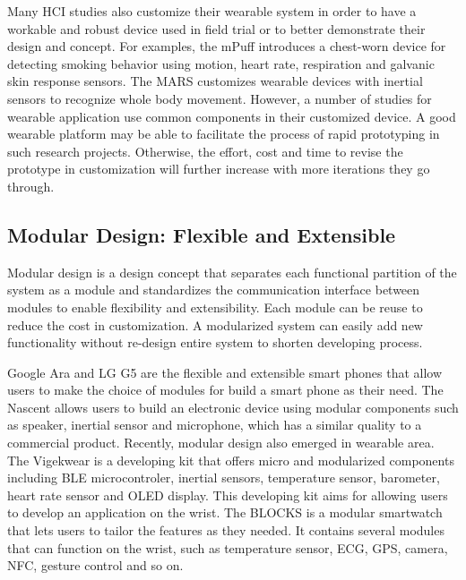Many HCI studies also customize their wearable system in order to have a workable and robust device used in field trial or to better demonstrate their design and concept.
For examples, the mPuff \cite{mPuff:2012:MAD:2185677.2185741} introduces a chest-worn device for detecting smoking behavior using motion, heart rate, respiration and galvanic skin response sensors.
The MARS \cite{Mokaya:2013:MMA:2461381.2461406} customizes wearable devices with inertial sensors to recognize whole body movement.
However, a number of studies for wearable application \cite{mPuff:2012:MAD:2185677.2185741, Lane:2015:ZCD:2742647.2742672, Mokaya:2013:MMA:2461381.2461406, Thompson:2015:DHA:2750858.2807536, Mokaya:2015:MVB:2750858.2804258, Lorincz:2009:MWS:1644038.1644057, Yatani:2012:BWA:2370216.2370269} use common components in their customized device. A good wearable platform may be able to facilitate the process of rapid prototyping in such research projects. Otherwise, the effort, cost and time to revise the prototype in customization will further increase with more iterations they go through.

\subsection{Modular Design: Flexible and Extensible}
Modular design is a design concept that separates each functional partition of the system as a module and standardizes the communication interface between modules to enable flexibility and extensibility.
Each module can be reuse to reduce the cost in customization. A modularized system can easily add new functionality without re-design entire system to shorten developing process.

Google Ara \cite{GoogleAra} and LG G5 \cite{LGG5} are the flexible and extensible smart phones that allow users to make the choice of modules for build a smart phone as their need.
The Nascent \cite{Nascent} allows users to build an electronic device using modular components such as speaker, inertial sensor and microphone, which has a similar quality to a commercial product.
Recently, modular design also emerged in wearable area.
The Vigekwear \cite{Vigekwear} is a developing kit that offers micro and modularized components including BLE microcontroler, inertial sensors, temperature sensor, barometer, heart rate sensor and OLED display.
This developing kit aims for allowing users to develop an application on the wrist.
The BLOCKS \cite{BLOCKS} is a modular smartwatch that lets users to tailor the features as they needed. It contains several modules that can function on the wrist, such as temperature sensor, ECG, GPS, camera, NFC, gesture control and so on.

